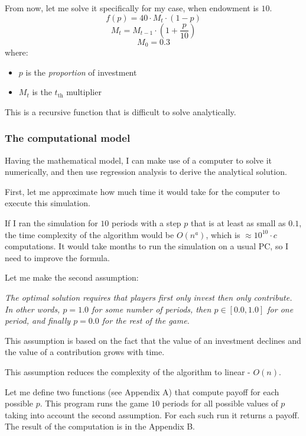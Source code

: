 			From now, let me solve it specifically for my case, when endowment is $10$.
			\[
				f(p) = 40 \cdot M_t \cdot (1 - p)
			\]
			\[
				M_t = M_{t-1} \cdot (1 + \frac{p}{10})
			\]
			\[
				M_0 = 0.3
			\]
			where:
			\begin{itemize}
				\item
					$p$ is the \emph{proportion} of investment
				\item
					$M_t$ is the $t_\text{th}$ multiplier
			\end{itemize}
			
			This is a recursive function that is difficult to solve analytically.
	
		\subsubsection{The computational model}
		
			Having the mathematical model, I can make use of a computer to solve it numerically, and then use regression analysis to derive the analytical solution.

			First, let me approximate how much time it would take for the computer to execute this simulation.
			
			If I ran the simulation for $10$ periods with a step $p$ that is at least as small as $0.1$, the time complexity of the algorithm would be $O(n^a)$, which is $\approx 10^{10} \cdot c$ computations. It would take months to run the simulation on a usual PC, so I need to improve the formula.

			Let me make the second assumption:
			\begin{displayquote}
				\emph{
					The optimal solution requires that players first only invest then only contribute.
					In other words, $p=1.0$ for some number of periods, then $p \in [0.0, 1.0]$ for one period,
					and finally $p = 0.0$ for the rest of the game.
				}
			\end{displayquote}
			
			This assumption is based on the fact that the value of an investment declines and the value of a contribution grows with time.
			
			This assumption reduces the complexity of the algorithm to linear - $O(n)$.

			Let me define two functions (see Appendix A) that compute payoff for each possible $p$. This program runs the game $10$ periods for all possible values of $p$ taking into account the second assumption. For each such run it returns a payoff. The result of the computation is in the Appendix B.

